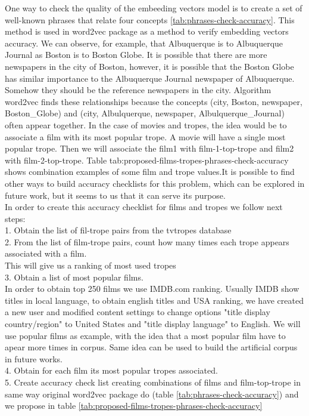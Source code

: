 \documentclass[letterpaper]{article}
\begin{document}
	 One way to check the quality of the embeeding vectors model is to create a set of 
	 well-known phrases that relate four concepts \ref{tab:phrases-check-accuracy}. This method is used in word2vec package \cite{mikolov2013} as a method to verify 
	 embedding vectors accuracy. We can observe, for example, that Albuquerque is to Albuquerque Journal
	  as Boston is to Boston Globe. It is possible that there are more newspapers in the city of Boston, however, it is possible that the Boston Globe has similar importance to the Albuquerque Journal newspaper of Albuquerque. Somehow they should be the reference newspapers in the city. Algorithm word2vec finds these relationships because the concepts (city, Boston, newspaper, Boston\_Globe) and (city, Albulquerque, newspaper, Albulquerque\_Journal) often appear together. 
	  In the case of movies and tropes, the idea would be to associate a film with its most popular trope. A movie will have a single most popular trope. 
	  Then we will associate the film1 with film-1-top-trope and film2 with film-2-top-trope. Table tab:proposed-films-tropes-phrases-check-accuracy shows combination examples of some film and trope values.It is possible to find other ways to build accuracy checklists for this problem, which can be explored in future work,
	   but it seems to us that it can serve its purpose.\\
	  
	  In order to create this accuracy checklist for films and tropes we follow next steps:\\
	  1. Obtain the list of fil-trope pairs from the tvtropes database\\
	  2. From the list of film-trope pairs, count how many times each trope appears associated with a film.\\ This will give us a ranking of most used tropes\\
	  3. Obtain a list of most  popular films.\\ 
      In order to obtain top 250 films we use IMDB.com ranking. Usually IMDB show titles in local language, to obtain english titles and USA ranking, we have created a new user and modified content settings to change options "title display country/region" to United States and "title display language" to English. We will use popular films as example, with
      the idea that a most popular film have to apear more times in corpus. Same idea can be used to build the artificial corpus in future works.\\
      4. Obtain for each film its most popular tropes associated.\\
      5. Create accuracy check list creating combinations of films and film-top-trope in same way original word2vec package do (table \ref{tab:phrases-check-accuracy}) and we propose in table \ref{tab:proposed-films-tropes-phrases-check-accuracy}\\ 
      
\end{document}
